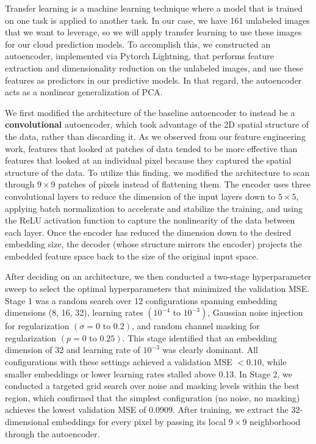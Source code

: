 \documentclass[11pt,letterpaper]{article}
\begin{document}
Transfer learning is a machine learning technique where a model that is trained on one task is applied to another task. In our case, we have 161 unlabeled images that we want to leverage, so we will apply transfer learning to use these images for our cloud prediction models. To accomplish this, we constructed an autoencoder, implemented via Pytorch Lightning, that performs feature extraction and dimensionality reduction on the unlabeled images, and use these features as predictors in our predictive models. In that regard, the autoencoder acts as a nonlinear generalization of PCA.

We first modified the architecture of the baseline autoencoder to instead be a \textbf{convolutional} autoencoder, which took advantage of the 2D spatial structure of the data, rather than discarding it. As we observed from our feature engineering work, features that looked at patches of data tended to be more effective than features that looked at an individual pixel because they captured the spatial structure of the data. To utilize this finding, we modified the architecture to scan through $9 \times 9$ patches of pixels instead of flattening them. The encoder uses three convolutional layers to reduce the dimension of the input layers down to $5 \times 5$, applying batch normalization to accelerate and stabilize the training, and using the ReLU activation function to capture the nonlinearity of the data between each layer. Once the encoder has reduced the dimension down to the desired embedding size, the decoder (whose structure mirrors the encoder) projects the embedded feature space back to the size of the original input space.

After deciding on an architecture, we then conducted a two-stage hyperparameter sweep to select the optimal hyperparameters that minimized the validation MSE. Stage 1 was a random search over 12 configurations spanning embedding dimensions (8, 16, 32), learning rates $(10^{-4}\text{ to }10^{-3})$, Gaussian noise injection for regularization $(\sigma=0 \text{ to } 0.2)$, and random channel masking for regularization $(p = 0 \text{ to } 0.25)$. This stage identified that an embedding dimension of 32 and learning rate of $10^{-3}$ was clearly dominant. All configurations with these settings achieved a validation MSE $< 0.10$, while smaller embeddings or lower learning rates stalled above 0.13. In Stage 2, we conducted a targeted grid search over noise and masking levels within the best region, which confirmed that the simplest configuration (no noise, no masking) achieves the lowest validation MSE of 0.0909. After training, we extract the 32-dimensional embeddings for every pixel by passing its local $9 \times 9$ neighborhood through the autoencoder.
\end{document}
